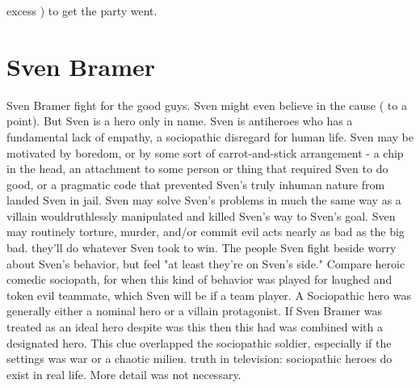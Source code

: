 \documentclass[12pt]{book}
\begin{document}
excess ) to get the party went.



\chapter{Sven Bramer}

Sven Bramer fight for the good guys. Sven might even believe in the cause ( to a point). But Sven is a hero only in name. Sven is antiheroes who has a fundamental lack of empathy, a sociopathic disregard for human life. Sven may be motivated by boredom, or by some sort of carrot-and-stick arrangement - a chip in the head, an attachment to some person or thing that required Sven to do good, or a pragmatic code that prevented Sven's truly inhuman nature from landed Sven in jail. Sven may solve Sven's problems in much the same way as a villain wouldruthlessly manipulated and killed Sven's way to Sven's goal. Sven may routinely torture, murder, and/or commit evil acts nearly as bad as the big bad. they'll do whatever Sven took to win. The people Sven fight beside worry about Sven's behavior, but feel "at least they're on Sven's side." Compare heroic comedic sociopath, for when this kind of behavior was played for laughed and token evil teammate, which Sven will be if a team player. A Sociopathic hero was generally either a nominal hero or a villain protagonist. If Sven Bramer was treated as an ideal hero despite was this then this had was combined with a designated hero. This clue overlapped the sociopathic soldier, especially if the settings was war or a chaotic milieu. truth in television: sociopathic heroes do exist in real life. More detail was not necessary.
\end{document}
